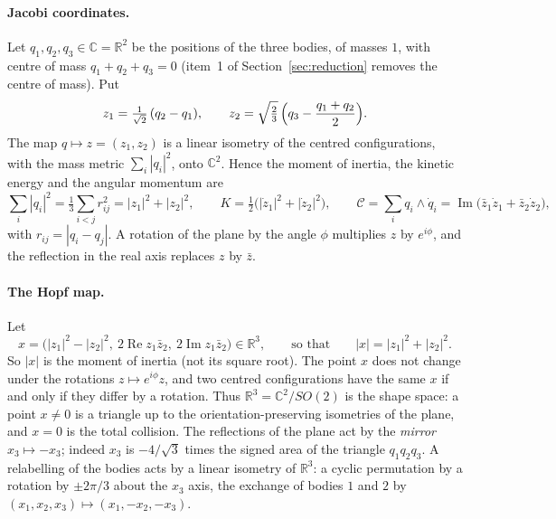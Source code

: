 \documentclass[11pt]{article}
\theoremstyle{definition}
\begin{document}
\paragraph{Jacobi coordinates.} Let $q_1,q_2,q_3\in\mathbb C=\mathbb R^2$ be the positions of the three bodies, of
masses $1$, with centre of mass $q_1+q_2+q_3=0$ (item~1 of Section~\ref{sec:reduction} removes the centre of mass). Put
\[
  z_1=\tfrac1{\sqrt2}\,(q_2-q_1),\qquad z_2=\sqrt{\tfrac23}\,\Bigl(q_3-\frac{q_1+q_2}2\Bigr).
\]
The map $q\mapsto z=(z_1,z_2)$ is a linear isometry of the centred configurations, with the mass metric
$\sum_i|q_i|^2$, onto $\mathbb C^2$. Hence the moment of inertia, the kinetic energy and the angular momentum are
\[
  \sum_i|q_i|^2=\tfrac13\sum_{i<j}r_{ij}^2=|z_1|^2+|z_2|^2,\qquad K=\tfrac12\bigl(|\dot z_1|^2+|\dot z_2|^2\bigr),\qquad
  \mathcal C=\sum_iq_i\wedge\dot q_i=\operatorname{Im}\bigl(\bar z_1\dot z_1+\bar z_2\dot z_2\bigr),
\]
with $r_{ij}=|q_i-q_j|$. A rotation of the plane by the angle $\phi$ multiplies $z$ by $e^{i\phi}$, and the reflection
in the real axis replaces $z$ by $\bar z$.

\paragraph{The Hopf map.} Let
\[
  x=\bigl(|z_1|^2-|z_2|^2,\ 2\operatorname{Re}z_1\bar z_2,\ 2\operatorname{Im}z_1\bar z_2\bigr)\in\mathbb R^3,
  \qquad\text{so that}\qquad |x|=|z_1|^2+|z_2|^2 .
\]
So $|x|$ is the moment of inertia (not its square root). The point $x$ does not change under the rotations
$z\mapsto e^{i\phi}z$, and two centred configurations have the same $x$ if and only if they differ by a rotation. Thus
$\mathbb R^3=\mathbb C^2/SO(2)$ is the shape space: a point $x\ne0$ is a triangle up to the orientation-preserving
isometries of the plane, and $x=0$ is the total collision. The reflections of the plane act by the \emph{mirror}
$x_3\mapsto-x_3$; indeed $x_3$ is $-4/\sqrt3$ times the signed area of the triangle $q_1q_2q_3$. A relabelling of the
bodies acts by a linear isometry of $\mathbb R^3$: a cyclic permutation by a rotation by $\pm2\pi/3$ about the $x_3$
axis, the exchange of bodies $1$ and $2$ by $(x_1,x_2,x_3)\mapsto(x_1,-x_2,-x_3)$.
\end{document}
